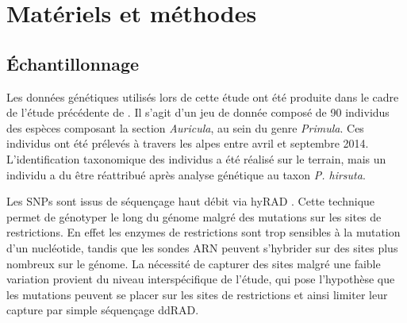 \documentclass[12pt,a4paper,notitlepage]{article}
\begin{document}
%
\section{Matériels et méthodes}

\subsection{Échantillonnage}

Les données génétiques utilisés lors de cette étude ont été produite dans le cadre de l'étude précédente de \citet{Boucher2016a}. Il s'agit d'un jeu de donnée composé de 90 individus des espèces composant la section \textit{Auricula}, au sein du genre \textit{Primula}. Ces individus ont été prélevés à travers les alpes entre avril et septembre 2014. L'identification taxonomique des individus a été réalisé sur le terrain, mais un individu a du être réattribué après analyse génétique au taxon \textit{P. hirsuta}.

Les SNPs sont issus de séquençage haut débit via hyRAD \citep{Suchan2016}. Cette technique permet de génotyper le long du génome malgré des mutations sur les sites de restrictions. En effet les enzymes de restrictions sont trop sensibles à la mutation d'un nucléotide, tandis que les sondes ARN peuvent s'hybrider sur des sites plus nombreux sur le génome. La nécessité de capturer des sites malgré une faible variation provient du niveau interspécifique de l'étude, qui pose l'hypothèse que les mutations peuvent se placer sur les sites de restrictions et ainsi limiter leur capture par simple séquençage ddRAD. 

\end{document}
